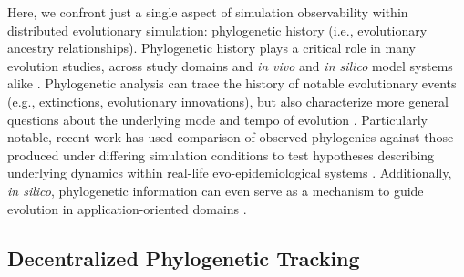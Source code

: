 Here, we confront just a single aspect of simulation observability within distributed evolutionary simulation: phylogenetic history (i.e., evolutionary ancestry relationships).
Phylogenetic history plays a critical role in many evolution studies, across study domains and \textit{in vivo} and \textit{in silico} model systems alike \citep{faithConservationEvaluationPhylogenetic1992,STAMATAKIS2005phylogenetics,frenchHostPhylogenyShapes2023,kim2006discovery,lewinsohnStatedependentEvolutionaryModels2023a,lenski2003evolutionary,moreno2021case}.
Phylogenetic analysis can trace the history of notable evolutionary events (e.g., extinctions, evolutionary innovations), but also characterize more general questions about the underlying mode and tempo of evolution \citep{moreno2023toward,hernandez2022can,shahbandegan2022untangling,lewinsohnStatedependentEvolutionaryModels2023a}.
Particularly notable, recent work has used comparison of observed phylogenies against those produced under differing simulation conditions to test hypotheses describing underlying dynamics within real-life evo-epidemiological systems \citep{giardina2017inference,voznica2022deep}.
Additionally, \textit{in silico}, phylogenetic information can even serve as a mechanism to guide evolution in application-oriented domains \citep{lalejini2024phylogeny,lalejini2024runtime,murphy2008simple,burke2003increased}.

\subsection{Decentralized Phylogenetic Tracking}


